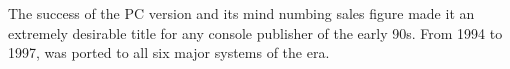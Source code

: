 The success of the PC version and its mind numbing sales figure made it an extremely desirable title for any console publisher of the early 90s. From 1994 to 1997, \doom was ported to all six major systems of the era.\\
\par


